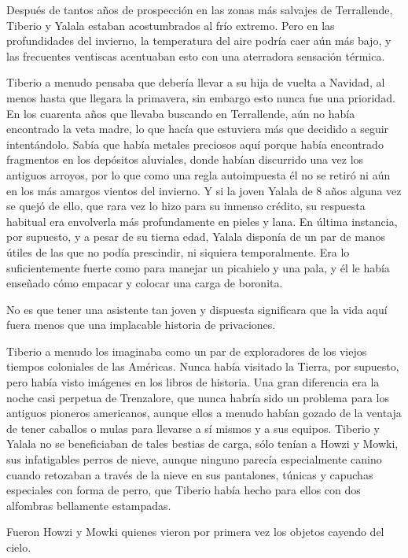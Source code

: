 Después de tantos años de prospección en las zonas más salvajes de Terrallende, Tiberio y Yalala estaban acostumbrados al frío extremo. Pero en las profundidades del invierno, la temperatura del aire podría caer aún más bajo, y las frecuentes ventiscas acentuaban esto con una aterradora sensación térmica.
 
Tiberio a menudo pensaba que debería llevar a su hija de vuelta a Navidad, al menos hasta que llegara la primavera, sin embargo esto nunca fue una prioridad. En los cuarenta años que llevaba buscando en Terrallende, aún no había encontrado la veta madre, lo que hacía que estuviera más que decidido a seguir intentándolo. Sabía que había metales preciosos aquí porque había encontrado fragmentos en los depósitos aluviales, donde habían discurrido una vez los antiguos arroyos, por lo que como una regla autoimpuesta él no se retiró ni aún en los más amargos vientos del invierno. Y si la joven Yalala de 8 años alguna vez se quejó de ello, que rara vez lo hizo para su inmenso crédito, su respuesta habitual era envolverla más profundamente en pieles y lana. En última instancia, por supuesto, y a pesar de su tierna edad, Yalala disponía de un par de manos útiles de las que no podía prescindir, ni siquiera temporalmente. Era lo suficientemente fuerte como para manejar un picahielo y una pala, y él le había enseñado cómo empacar y colocar una carga de boronita.
 
No es que tener una asistente tan joven y dispuesta significara que la vida aquí fuera menos que una implacable historia de privaciones.
 
Tiberio a menudo los imaginaba como un par de exploradores de los viejos tiempos coloniales de las Américas. Nunca había visitado la Tierra, por supuesto, pero había visto imágenes en los libros de historia. Una gran diferencia era la noche casi perpetua de Trenzalore, que nunca habría sido un problema para los antiguos pioneros americanos, aunque ellos a menudo habían gozado de la ventaja de tener caballos o mulas para llevarse a sí mismos y a sus equipos. Tiberio y Yalala no se beneficiaban de tales bestias de carga, sólo tenían a Howzi y Mowki, sus infatigables perros de nieve, aunque ninguno parecía especialmente canino cuando retozaban a través de la nieve en sus pantalones, túnicas y capuchas especiales con forma de perro, que Tiberio había hecho para ellos con dos alfombras bellamente estampadas.
 
Fueron Howzi y Mowki quienes vieron por primera vez los objetos cayendo del cielo.
 
